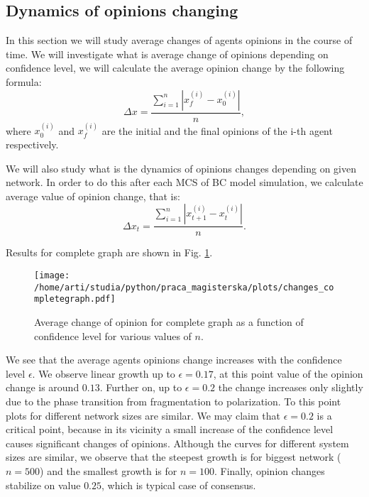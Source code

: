 \documentclass[a4paper, 12pt]{article}
\begin{document}
\subsection{Dynamics of opinions changing}
In this section we will study average changes of agents opinions in the course of time. We will investigate what is average change of opinions depending on confidence level, we will calculate the average opinion change by the following formula:
\begin{equation}
\Delta x = \frac{ \sum_{i=1}^n \left|x_{f}^{(i)} - x_0^{(i)} \right|}{n},
\end{equation}
where $x_0^{(i)}$ and $x_{f}^{(i)}$ are the initial and the final opinions of the i-th agent respectively.

\indent

We will also study what is the dynamics of opinions changes depending on given network. In order to do this after each MCS of BC model simulation, we calculate average value of opinion change, that is:
\begin{equation}
\Delta x_t = \frac{\sum_{i=1}^n \left|x_{t+1}^{(i)} - x_{t}^{(i)} \right|}{n}.
\end{equation}

Results for complete graph are shown in Fig. \ref{f15}.

\begin{figure}[H]
		\centering
		\texttt{[image: /home/arti/studia/python/praca\_magisterska/plots/changes\_completegraph.pdf]}
		\caption{Average change of opinion for complete graph as a function of confidence level for various values of $n$.}
		\label{f15}
\end{figure}

We see that the average agents opinions change increases with the confidence level $\epsilon$. We observe linear growth up to $\epsilon=0.17$, at this point value of the opinion change is around $0.13$. Further on, up to $\epsilon=0.2$ the change increases only slightly due to the phase transition from fragmentation to polarization. To this point plots for different network sizes are similar. We may claim that $\epsilon=0.2$ is a critical point, because in its vicinity a small increase of the confidence level causes significant changes of opinions. Although the curves for different system sizes are similar, we observe that the steepest growth is for biggest network ($n=500$) and the smallest growth is for $n=100$. Finally, opinion changes stabilize on value $0.25$, which is typical case of consensus.
\end{document}
